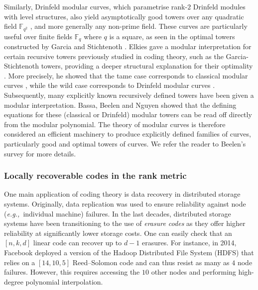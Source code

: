 \documentclass[11pt]{article}
\theoremstyle{definition}
\newcommand\F{\mathbb{F}}
\newcommand\Fq{\mathbb{F}_q}
\newcommand{\eg}{\textit{e.g.,~}}
\begin{document}
Similarly, Drinfeld modular curves, which parametrise rank-$2$ Drinfeld modules with level structures, also yield asymptotically good towers over any quadratic field $\F_{q^2}$ \cite{bassa2015good}, and more generally any non-prime field. These curves are particularly useful over finite fields $\Fq$ where $q$ is a square, as seen in the optimal towers constructed by Garcia and Stichtenoth \cite{GS95}. Elkies gave a modular interpretation for certain recursive towers previously studied in coding theory, such as the Garcia-Stichtenoth towers, providing a deeper structural explanation for their optimality \cite{E01}. More precisely, he showed that the tame case corresponds to classical modular curves \cite{E97}, while the wild case corresponds to Drinfeld modular curves \cite{E01}. Subsequently, many explicitly known recursively defined towers have been given a modular interpretation. Bassa, Beelen and Nguyen \cite{bassa2014good,bassa2015good} showed that the defining equations for these (classical or Drinfeld) modular towers can be read off directly from the modular polynomial. The theory of modular curves is therefore considered an efficient machinery to produce explicitly defined families of curves, particularly good and optimal towers of curves. We refer the reader to Beelen's survey \cite{beelen2022surveyrecursivetowersiharas} for more details.

\subsubsection{Locally recoverable codes in the rank metric}\label{subsub:LRC}
One main application of coding theory is data recovery in distributed storage systems. Originally, data replication was used to ensure reliability against node (\eg individual machine) failures. In the last decades, distributed storage systems have been transitioning to the use of \emph{erasure codes} as they offer higher reliability at significantly lower storage costs. One can easily check that an $[n,k,d]$ linear code can recover up to $d-1$ erasures. For instance, in 2014, Facebook deployed a version of the Hadoop Distributed File System (HDFS) that relies on a $[14, 10, 5]$ Reed--Solomon code and can thus resist as many as $4$ node failures. However, this requires accessing the $10$ other nodes and performing high-degree polynomial interpolation.
\end{document}
